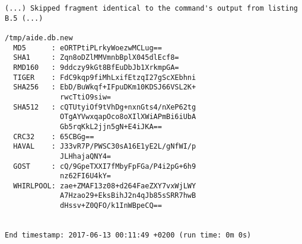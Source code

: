 \documentclass[thesis]{subfiles}
\begin{document}
\begin{appendices}
\begin{lstlisting}
(...) Skipped fragment identical to the command's output from listing B.5 (...)

/tmp/aide.db.new
  MD5      : eORTPtiPLrkyWoezwMCLug==
  SHA1     : Zqn8oDZlMMVmnbBplX045dlEcf8=
  RMD160   : 9ddczy9kGt8BfEuDbJb1XrkmpGA=
  TIGER    : FdC9kqp9fiMhLxifEtzqI27gScXEbhni
  SHA256   : EbD/BuWkqf+IFpuDKm10KDSJ66VSL2K+
             rwcTtiO9siw=
  SHA512   : cQTUtyiOf9tVhDg+nxnGts4/nXeP62tg
             OTgAYVwxqapOco8oXIlXWiAPmBi6iUbA
             Gb5rqKkL2jjn5gN+E4iJKA==
  CRC32    : 65CBGg==
  HAVAL    : J33vR7P/PWSC30sA16E1yE2L/gNfWI/p
             JLHhajaQNY4=
  GOST     : cQ/9GpeTXXI7fMbyFpFGa/P4i2pG+6h9
             nz62FI6U4kY=
  WHIRLPOOL: zae+ZMAF13z08+d264FaeZXY7vxWjLWY
             A7Hzao29+EksBihJ2n4qJb85sSRR7hwB
             dHssv+Z0QFO/k1InWBpeCQ==


End timestamp: 2017-06-13 00:11:49 +0200 (run time: 0m 0s)
\end{lstlisting}


\end{appendices}
\end{document}
